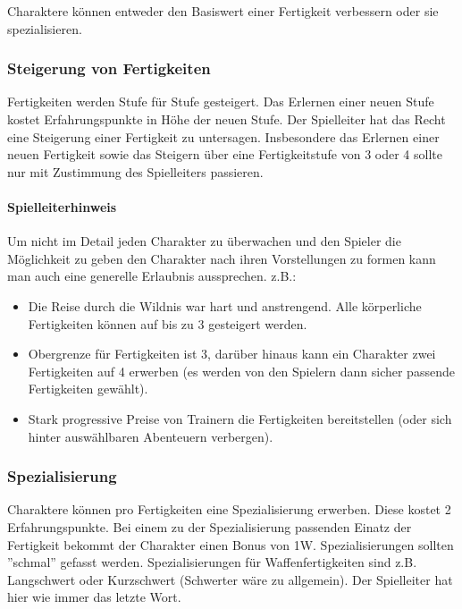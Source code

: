 \documentclass{article}
\begin{document}
Charaktere können entweder den Basiswert einer Fertigkeit verbessern oder sie spezialisieren.

\subsubsection{Steigerung von Fertigkeiten}

Fertigkeiten werden Stufe für Stufe gesteigert. Das Erlernen einer neuen Stufe kostet Erfahrungspunkte in Höhe der
neuen Stufe. Der Spielleiter hat das Recht eine Steigerung einer Fertigkeit zu untersagen. Insbesondere das Erlernen
einer neuen Fertigkeit sowie das Steigern über eine Fertigkeitstufe von 3 oder 4 sollte nur mit Zustimmung des
Spielleiters passieren.

\begin{mdframed}[hidealllines=true, backgroundcolor=black!10]
\paragraph{Spielleiterhinweis}

Um nicht im Detail jeden Charakter zu überwachen und den Spieler die Möglichkeit zu geben den Charakter nach ihren
Vorstellungen zu formen kann man auch eine generelle Erlaubnis aussprechen. z.B.:
\begin{itemize}
\item Die Reise durch die Wildnis war hart und anstrengend. Alle körperliche Fertigkeiten können auf bis zu 3 gesteigert werden.
\item Obergrenze für Fertigkeiten ist 3, darüber hinaus kann ein Charakter zwei Fertigkeiten auf 4 erwerben (es werden von den Spielern dann sicher passende Fertigkeiten gewählt).
\item Stark progressive Preise von Trainern die Fertigkeiten bereitstellen (oder sich hinter auswählbaren Abenteuern verbergen).
\end{itemize}

\end{mdframed}
\subsubsection{Spezialisierung}

Charaktere können pro Fertigkeiten eine Spezialisierung erwerben. Diese kostet 2 Erfahrungspunkte. Bei einem zu der
Spezialisierung passenden Einatz der Fertigkeit bekommt der Charakter einen Bonus von 1W. Spezialisierungen sollten
''schmal'' gefasst werden. Spezialisierungen für Waffenfertigkeiten sind z.B. Langschwert oder Kurzschwert (Schwerter
wäre zu allgemein). Der Spielleiter hat hier wie immer das letzte Wort.
\end{document}
